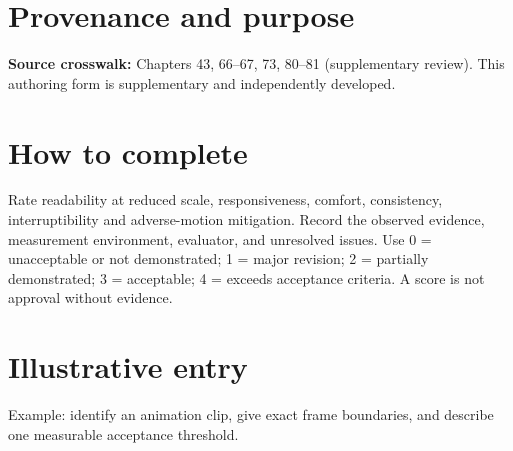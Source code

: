 \documentclass[10pt,letterpaper]{article}
\begin{document}
\makedoctitle
\makedocsummary

\section{Provenance and purpose}
\textbf{Source crosswalk:} Chapters 43, 66--67, 73, 80--81 (supplementary review). This authoring form is supplementary and independently developed.
\section{How to complete}
Rate readability at reduced scale, responsiveness, comfort, consistency, interruptibility and adverse-motion mitigation. Record the observed evidence, measurement environment, evaluator, and unresolved issues. Use 0 = unacceptable or not demonstrated; 1 = major revision; 2 = partially demonstrated; 3 = acceptable; 4 = exceeds acceptance criteria. A score is not approval without evidence.
\section{Illustrative entry}
Example: identify an animation clip, give exact frame boundaries, and describe one measurable acceptance threshold.
\end{document}
